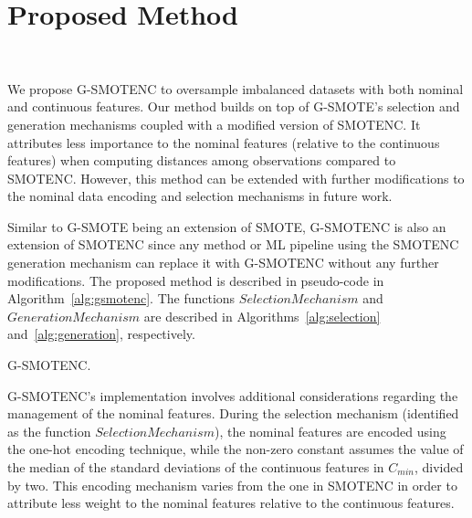 \section{Proposed Method}~\label{sec:proposed_method-gsmotenc}

We propose G-SMOTENC to oversample imbalanced datasets with both nominal and
continuous features. Our method builds on top of G-SMOTE's selection and
generation mechanisms coupled with a modified version of SMOTENC. It
attributes less importance to the nominal features (relative to the continuous
features) when computing distances among observations compared to SMOTENC.
However, this method can be extended with further modifications to the
nominal data encoding and selection mechanisms in future work. 

Similar to G-SMOTE being an extension of SMOTE, G-SMOTENC is also an extension
of SMOTENC since any method or ML pipeline using the SMOTENC generation
mechanism can replace it with G-SMOTENC without any further modifications. The
proposed method is described in pseudo-code in Algorithm~\ref{alg:gsmotenc}.
The functions $SelectionMechanism$ and $GenerationMechanism$ are described in
Algorithms~\ref{alg:selection} and~\ref{alg:generation}, respectively.

\begin{algorithm}
    \caption{G-SMOTENC.}\label{alg:gsmotenc}
    \DontPrintSemicolon%
    

\end{algorithm}

G-SMOTENC's implementation involves additional considerations regarding the
management of the nominal features. During the selection mechanism (identified
as the function $SelectionMechanism$), the nominal features are encoded
using the one-hot encoding technique, while the non-zero constant assumes the
value of the median of the standard deviations of the continuous features in
$C_{min}$, divided by two. This encoding mechanism varies from the one in
SMOTENC in order to attribute less weight to the nominal features relative
to the continuous features.

